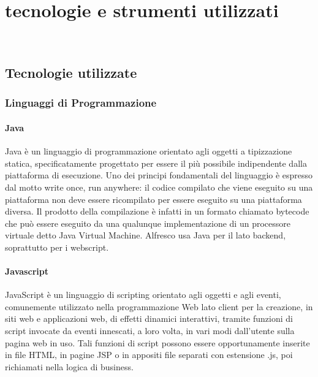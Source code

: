 
\chapter{tecnologie e strumenti utilizzati}
\label{cap:tecnologie-strumenti}

\\

\section{Tecnologie utilizzate}
\subsection{Linguaggi di Programmazione}
\subsubsection{Java}
Java è un linguaggio di programmazione orientato agli oggetti a tipizzazione statica,
specificatamente progettato per essere il più possibile indipendente dalla piattaforma
di esecuzione. Uno dei principi fondamentali del linguaggio è espresso dal motto write
once, run anywhere: il codice compilato che viene eseguito su una piattaforma non
deve essere ricompilato per essere eseguito su una piattaforma diversa. Il prodotto
della compilazione è infatti in un formato chiamato bytecode che può essere eseguito da
una qualunque implementazione di un processore virtuale detto Java Virtual Machine.
Alfresco usa Java per il lato backend, soprattutto per i webscript.
\subsubsection{Javascript}
JavaScript è un linguaggio di scripting orientato agli oggetti e agli eventi, comunemente
utilizzato nella programmazione Web lato client per la creazione, in siti web e
applicazioni web, di effetti dinamici interattivi, tramite funzioni di script invocate da
eventi innescati, a loro volta, in vari modi dall’utente sulla pagina web in uso. Tali
funzioni di script possono essere opportunamente inserite in file HTML, in pagine JSP
o in appositi file separati con estensione .js, poi richiamati nella logica di business.
